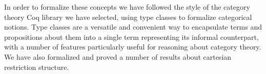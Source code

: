 \documentclass{entcs} \usepackage{entcsmacro}
\begin{document}
In order to formalize these concepts we have followed the style of the category theory Coq library we have selected, using type classes to formalize categorical notions. Type classes are a versatile and convenient way to encapsulate terms and propositions about them into a single term representing its informal counterpart, with a number of features particularly useful for reasoning about category theory. We have also formalized and proved a number of results about cartesian restriction structure. 


	
	
	
	
\end{document}
